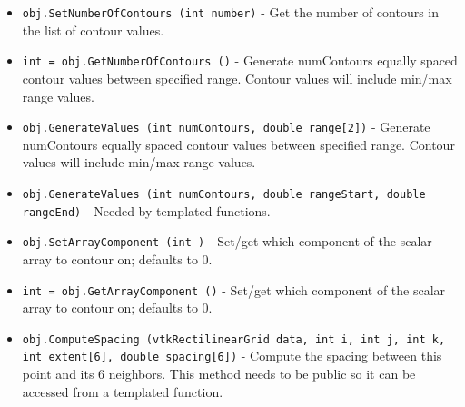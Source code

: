 \begin{itemize}
\item  \verb|obj.SetNumberOfContours (int number)| -  Get the number of contours in the list of contour values.

\item  \verb|int = obj.GetNumberOfContours ()| -  Generate numContours equally spaced contour values between specified
 range. Contour values will include min/max range values.

\item  \verb|obj.GenerateValues (int numContours, double range[2])| -  Generate numContours equally spaced contour values between specified
 range. Contour values will include min/max range values.

\item  \verb|obj.GenerateValues (int numContours, double rangeStart, double rangeEnd)| -  Needed by templated functions.

\item  \verb|obj.SetArrayComponent (int )| -  Set/get which component of the scalar array to contour on; defaults to 0.

\item  \verb|int = obj.GetArrayComponent ()| -  Set/get which component of the scalar array to contour on; defaults to 0.

\item  \verb|obj.ComputeSpacing (vtkRectilinearGrid data, int i, int j, int k, int extent[6], double spacing[6])| -  Compute the spacing between this point and its 6 neighbors.  This method
 needs to be public so it can be accessed from a templated function.

\end{itemize}
